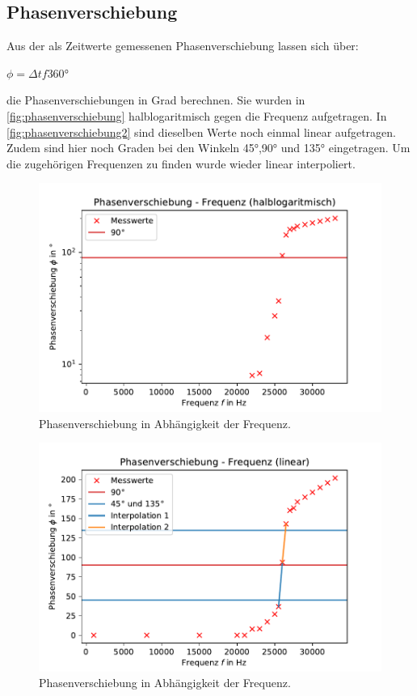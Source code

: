 \documentclass[
  bibliography=totoc,     %
  captions=tableheading,  %
  titlepage=firstiscover, %
]{scrartcl}
\begin{document}
  \subsection{Phasenverschiebung}
  \label{sec:phs}
  Aus der als Zeitwerte gemessenen Phasenverschiebung lassen sich über:
  \begin{center}
      $\phi=\Delta tf360°$\\
  \end{center}
  die Phasenverschiebungen in Grad berechnen. Sie wurden in \autoref{fig:phasenverschiebung} halblogaritmisch gegen die Frequenz
  aufgetragen. In \autoref{fig:phasenverschiebung2} sind dieselben Werte noch einmal linear aufgetragen. Zudem
  sind hier noch Graden bei den Winkeln 45°,90° und 135° eingetragen. Um die zugehörigen Frequenzen zu finden wurde
  wieder linear interpoliert.
  \begin{figure}
      \centering
      \includegraphics{phasenverschiebung.pdf}
      \caption{Phasenverschiebung in Abhängigkeit der Frequenz.}
      \label{fig:phasenverschiebung}
    \end{figure}
    \begin{figure}
      \centering
      \includegraphics{phasenverschiebunglin.pdf}
      \caption{Phasenverschiebung in Abhängigkeit der Frequenz.}
      \label{fig:phasenverschiebung2}
    \end{figure}
\end{document}
